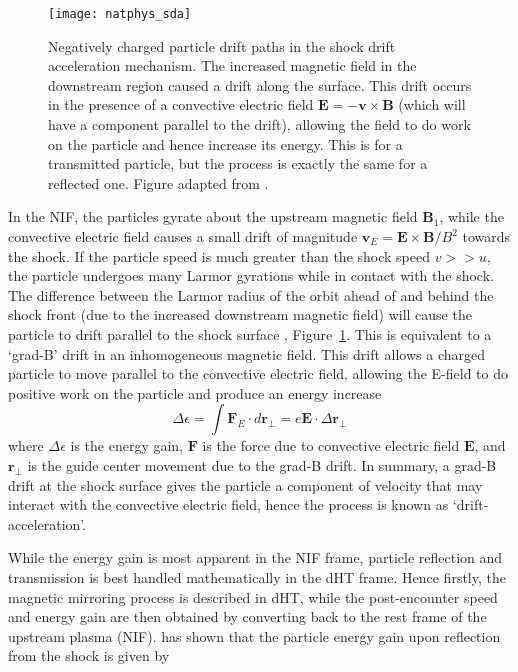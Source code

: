 \begin{figure}[!t] 
\begin{center}
\texttt{[image: natphys\_sda]}
\caption[Shock drift acceleration]{Negatively charged particle drift paths in the shock drift acceleration mechanism. The increased magnetic field in the downstream region caused a drift along the surface. This drift occurs in the presence of a convective electric field $\mathbf{E}=-\mathbf{v} \times \mathbf{B}$ (which will have a component parallel to the drift), allowing the field to do work on the particle and hence increase its energy. This is for a transmitted particle, but the process is exactly the same for a reflected one. Figure adapted from \citep{richardson2013}.}
\label{fig:sda}
\end{center}
\end{figure}
In the NIF, the particles gyrate about the upstream magnetic field $\mathbf{B}_1$, while the convective electric field causes a small drift of magnitude $\mathbf{v}_E = \mathbf{E}\times \mathbf{B}/B^2$ towards the shock. If the particle speed is much greater than the shock speed $v>>u$, the particle undergoes many Larmor gyrations while in contact with the shock. The difference between the Larmor radius of the orbit ahead of and behind the shock front (due to the increased downstream magnetic field) will cause the particle to drift parallel to the shock surface \citep{ball2001, toptychin1980}, Figure~\ref{fig:sda}. This is equivalent to a `grad-B' drift in an inhomogeneous magnetic field. This drift allows a charged particle to move parallel to the convective electric field, allowing the E-field to do positive work on the particle and produce an energy increase \citep{lever2001}
\begin{equation}
\Delta \epsilon = \int \mathbf{F}_E\cdot d{\mathbf{r_{\perp}}} = e\mathbf{E}\cdot\Delta \mathbf{r_{\perp}}
\end{equation}
where $\Delta \epsilon$ is the energy gain, $\mathbf{F}$ is the force due to convective electric field $\mathbf{E}$, and $\mathbf{r_{\perp}}$ is the guide center movement due to the grad-B drift. In summary, a grad-B drift at the shock surface gives the particle a component of velocity that may interact with the convective electric field, hence the process is known as \textquoteleft drift-acceleration'.


While the energy gain is most apparent in the NIF frame, particle reflection and transmission is best handled mathematically in the dHT frame. Hence firstly, the magnetic mirroring process is described in dHT, while the post-encounter speed and energy gain are then obtained by converting back to the rest frame of the upstream plasma (NIF). \citet{ball2001} has shown that the particle energy gain upon reflection from the shock is given by 

